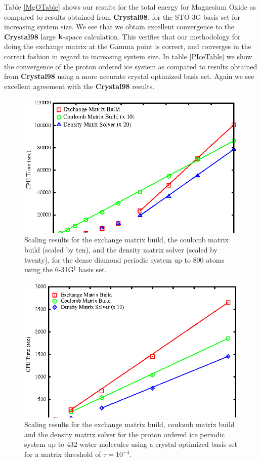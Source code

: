 \documentclass[prb,aps,nobibnotes,twocolumn,doublespace,twocolumngrid,superbib]{revtex4}
\begin{document}
Table \ref{MgOTable} shows our results for the total
energy for Magnesium Oxide as compared to results obtained from \textbf{Crystal98}.
for the STO-3G basis set for increasing system size. We see that we obtain excellent
convergence to the {\bf Crystal98} large ${\bf k}$-space calculation. This verifies that
our methodology for doing the exchange matrix at the Gamma point is correct, and converges 
in the correct fashion in regard to increasing system size. In table \ref{PIceTable}
we show the convergence of the proton ordered ice system as compared to results obtained from 
\textbf{Crystal98} using a more accurate crystal optimized basis set. Again we see excellent
agreement with the \textbf{Crystal98} results.
%
%
%
\suppressfloats
\begin{figure}
\caption{Scaling results for the exchange matrix build, the coulomb matrix
build (scaled by ten), and the density matrix solver (scaled by twenty),  
for the dense diamond periodic system up to 800 atoms using the
6-31G$ ^\dagger$ basis set.}
\label{figure:Scaling_Matrix_Build}
{\centering \includegraphics{Timing_Diamond_ONX.ps} \par} 
\end{figure}
%
\begin{figure}
\caption{Scaling results for the exchange matrix build, coulomb matrix
build and the density matrix solver  for the proton ordered ice periodic system up to 432 water molecules 
using a crystal optimized basis set\cite{CBS:511G:H,CBS:861G:MgO} for a matrix threshold of $\tau=10^{-4}$.}
\label{figure:Scaling_Matrix_Build_Ice}
{\centering \includegraphics{Timing_pIce_ONX_1.ps} \par} 
\end{figure}
\end{document}
